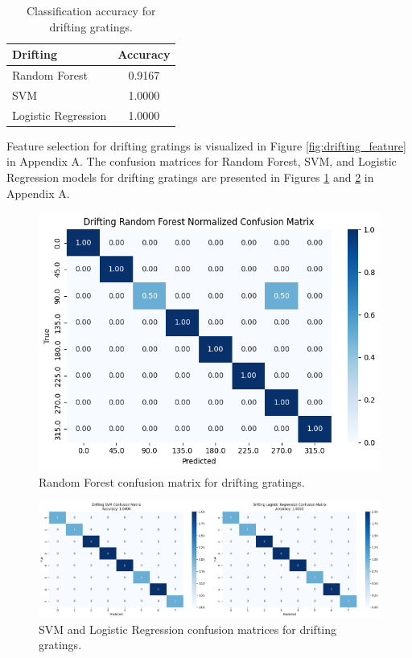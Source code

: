 \documentclass[10pt,twocolumn]{article}
\begin{document}
  \begin{table}[ht]
  \centering
  \begin{tabular}{l c}
  \hline
  \textbf{Drifting} & \textbf{Accuracy} \\
  \hline
  Random Forest        & 0.9167 \\
  SVM                  & 1.0000 \\
  Logistic Regression  & 1.0000 \\
  \hline
  \end{tabular}
  \caption{Classification accuracy for drifting gratings.}
  \label{tab:drifting_performance}
  \end{table}
  
  Feature selection for drifting gratings is visualized in Figure \ref{fig:drifting_feature} in Appendix A. The confusion matrices for Random Forest, SVM, and Logistic Regression models for drifting gratings are presented in Figures \ref{fig:drifting_rf_cm} and \ref{fig:drifting_svm_logr_cm} in Appendix A.  

\begin{figure}[ht]
\centering
\includegraphics[width=\linewidth]{report_images/drifting_random_forest_confusion_matrix.png}
\caption{Random Forest confusion matrix for drifting gratings.}
\label{fig:drifting_rf_cm}
\end{figure}

\begin{figure}[ht]
\centering
\includegraphics[width=\linewidth]{report_images/drifting_SVM_LogR_confusion_matrix.png}
\caption{SVM and Logistic Regression confusion matrices for drifting gratings.}
\label{fig:drifting_svm_logr_cm}
\end{figure}
\end{document}
